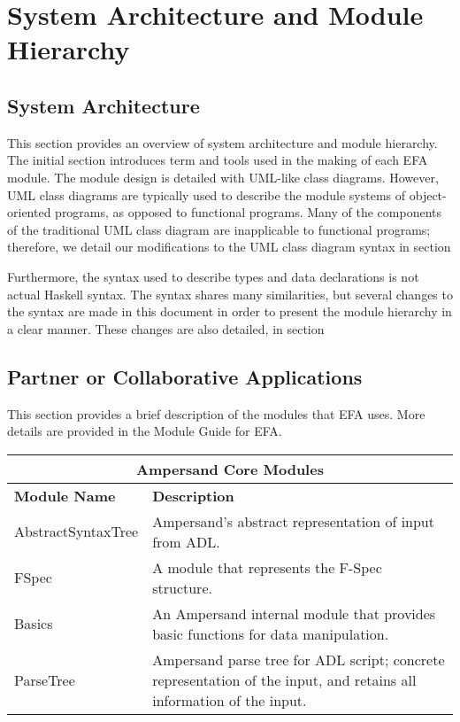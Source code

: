 \noindent
\section{System Architecture and Module Hierarchy}

\subsection{System Architecture}\label{SystemArch}
This section provides an overview of system architecture and module hierarchy. 
The 
initial section introduces term and tools used in the making of each EFA 
module. The module design is detailed with UML-like class diagrams. However, 
UML class diagrams are typically
used to describe the module systems of object-oriented programs, as opposed to
functional programs. Many of the components of the traditional UML class
diagram are inapplicable to functional programs; therefore, we detail our
modifications to the UML class diagram syntax in 
section%

Furthermore, the syntax used to describe types and data declarations is not
actual Haskell syntax. The syntax shares many similarities, but several changes
to the syntax are made in this document in order to present the module hierarchy
in a clear manner. These changes are also detailed, in 
section%

\subsection{Partner or Collaborative Applications}\label{subsec:Collaborative}
This section provides a brief description of the modules that EFA uses. More 
details are provided in the Module Guide for EFA.

\begin{adjustbox}{center}
\begin{tabular}{ |p{3.2cm}|p{11cm}|  }
\hline
\multicolumn{2}{|c|}{\bfseries{\large{Ampersand Core Modules}}} \\ 
\hline\hline
\bfseries{Module Name} & \bfseries{Description}\\
\hline
AbstractSyntaxTree   & Ampersand's abstract representation of input 
from 
ADL.   \\
\hline
FSpec &   A module that represents the F-Spec structure.\\
\hline
Basics & An Ampersand internal module that provides basic functions for 
data manipulation.\\
\hline
ParseTree    & Ampersand parse tree for ADL script; concrete 
representation 
of the input, and retains all information of the input. \\
\hline
\end{tabular}
\end{adjustbox}


